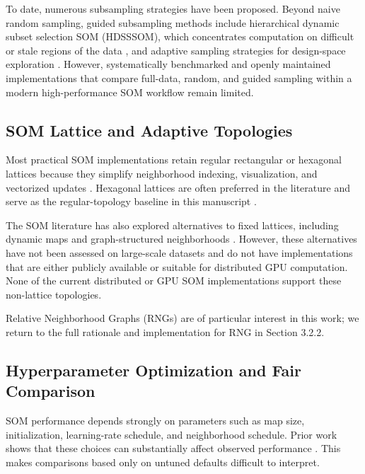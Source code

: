 \documentclass[10pt]{article} %
\begin{document}
To date, numerous subsampling strategies have been proposed. Beyond naive random sampling, guided subsampling methods include hierarchical dynamic subset selection SOM (HDSSSOM), which concentrates computation on difficult or stale regions of the data \citep{wetmoreSpeedingSelfOrganizingFeature2005}, and adaptive sampling strategies for design-space exploration \citep{itoDesignSpaceExploration2016}. However, systematically benchmarked and openly maintained implementations that compare full-data, random, and guided sampling within a modern high-performance SOM workflow remain limited.

\subsection{SOM Lattice and Adaptive Topologies}

Most practical SOM implementations retain regular rectangular or hexagonal lattices because they simplify neighborhood indexing, visualization, and vectorized updates \citep{kohonenSelforganizingMap1990,kohonenEssentialsSelforganizingMap2013}. Hexagonal lattices are often preferred in the literature and serve as the regular-topology baseline in this manuscript \citep{whiteTopologyMattersNetwork2008,kohonenEssentialsSelforganizingMap2013,forestSurveyImplementationPerformance2020}.

The SOM literature has also explored alternatives to fixed lattices, including dynamic maps and graph-structured neighborhoods \citep{vasighiDirectedBatchGrowing2017,spanakisAMSOMAdaptiveMoving2016,kangasVariantsSelforganizingMaps1990,jangUseMinimalSpanning2009}. However, these alternatives have not been assessed on large-scale datasets and do not have implementations that are either publicly available or suitable for distributed GPU computation. None of the current distributed or GPU SOM implementations support these non-lattice topologies.

Relative Neighborhood Graphs (RNGs) \citep{toussaintRelativeNeighbourhoodGraph1980} are of particular interest in this work; we return to the full rationale and implementation for RNG in Section 3.2.2.

\subsection{Hyperparameter Optimization and Fair Comparison}

SOM performance depends strongly on parameters such as map size, initialization, learning-rate schedule, and neighborhood schedule. Prior work shows that these choices can substantially affect observed performance \citep{akindukoSOMStochasticInitialization2016,forestSurveyImplementationPerformance2020}. This makes comparisons based only on untuned defaults difficult to interpret.
\end{document}
